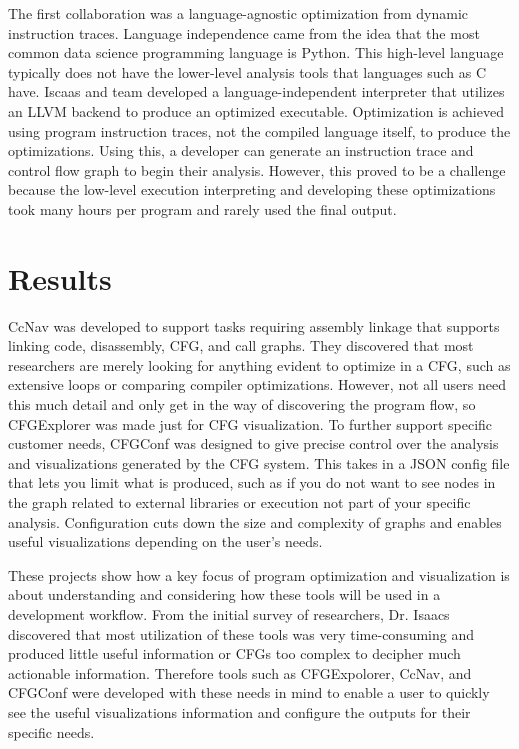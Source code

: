 \documentclass[journal,onecolumn]{IEEEtran}
\begin{document}
The first collaboration was a language-agnostic optimization from dynamic instruction traces. Language independence came from the idea that the most common data science programming language is Python. This high-level language typically does not have the lower-level analysis tools that languages such as C have. Iscaas and team developed a language-independent interpreter that utilizes an LLVM backend to produce an optimized executable. Optimization is achieved using program instruction traces, not the compiled language itself, to produce the optimizations. Using this, a developer can generate an instruction trace and control flow graph to begin their analysis. However, this proved to be a challenge because the low-level execution interpreting and developing these optimizations took many hours per program and rarely used the final output. 

\section{Results}

CcNav was developed to support tasks requiring assembly linkage that supports linking code, disassembly, CFG, and call graphs. They discovered that most researchers are merely looking for anything evident to optimize in a CFG, such as extensive loops or comparing compiler optimizations. However, not all users need this much detail and only get in the way of discovering the program flow, so CFGExplorer was made just for CFG visualization. To further support specific customer needs, CFGConf was designed to give precise control over the analysis and visualizations generated by the CFG system. This takes in a JSON config file that lets you limit what is produced, such as if you do not want to see nodes in the graph related to external libraries or execution not part of your specific analysis. Configuration cuts down the size and complexity of graphs and enables useful visualizations depending on the user's needs. 

These projects show how a key focus of program optimization and visualization is about understanding and considering how these tools will be used in a development workflow. From the initial survey of researchers, Dr. Isaacs discovered that most utilization of these tools was very time-consuming and produced little useful information or CFGs too complex to decipher much actionable information. Therefore tools such as CFGExpolorer, CcNav, and CFGConf were developed with these needs in mind to enable a user to quickly see the useful visualizations information and configure the outputs for their specific needs. 
\end{document}
